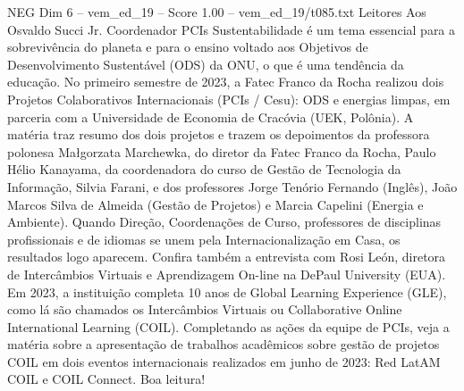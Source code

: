 \begin{textsample}{NEG Dim 6 – vem\_ed\_19 – Score 1.00 – vem\_ed\_19/t085.txt}  \label{ex:f6_neg_048}
Leitores Aos Osvaldo Succi Jr.
Coordenador PCIs Sustentabilidade é um tema essencial para a sobrevivência do planeta e para o ensino voltado aos Objetivos de Desenvolvimento Sustentável (ODS) da ONU, o que é uma tendência da educação.
No primeiro semestre de 2023, a Fatec Franco da Rocha realizou dois Projetos Colaborativos Internacionais (PCIs / Cesu): ODS e energias limpas, em parceria com a Universidade de Economia de Cracóvia (UEK, Polônia).
A matéria traz resumo dos dois projetos e trazem os depoimentos da professora polonesa Małgorzata Marchewka, do diretor da Fatec Franco da Rocha, Paulo Hélio Kanayama, da coordenadora do curso de Gestão de Tecnologia da Informação, Silvia Farani, e dos professores Jorge Tenório Fernando (Inglês), João Marcos Silva de Almeida (Gestão de Projetos) e Marcia Capelini (Energia e Ambiente).
Quando Direção, Coordenações de Curso, professores de disciplinas profissionais e de idiomas se unem pela Internacionalização em Casa, os resultados logo aparecem.
Confira também a entrevista com Rosi León, diretora de Intercâmbios Virtuais e Aprendizagem On-line na DePaul University (EUA).
Em 2023, a instituição completa 10 anos de Global Learning Experience (GLE), como lá são chamados os Intercâmbios Virtuais ou Collaborative Online International Learning (COIL).
Completando as ações da equipe de PCIs, veja a matéria sobre a apresentação de trabalhos acadêmicos sobre gestão de projetos COIL em dois eventos internacionais realizados em junho de 2023: Red LatAM COIL e COIL Connect.
Boa leitura!

\end{textsample}
